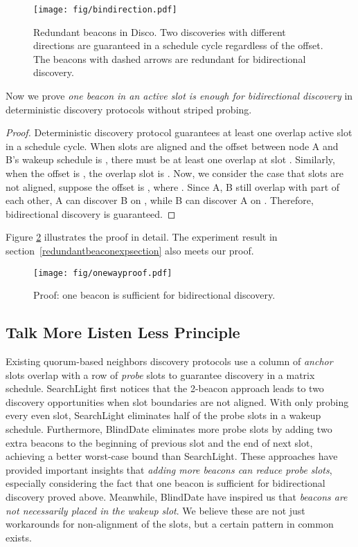 \documentclass[conference]{IEEEtran}
\begin{document}
\begin{figure}[t]
    \centering
    \texttt{[image: fig/bindirection.pdf]}
    \caption{Redundant beacons in Disco. Two discoveries with different directions are guaranteed in a schedule cycle regardless of the offset.
    The beacons with dashed arrows are redundant for bidirectional discovery.}\label{redundantbeacon}
\end{figure}

Now we prove \emph{one beacon in an active slot is enough for bidirectional discovery} in deterministic discovery protocols without striped probing.
\begin{proof}
Deterministic discovery protocol guarantees at least one overlap active slot in a schedule cycle.
When slots are aligned and the offset between node A and B's wakeup schedule is , there must be at least one overlap at slot .
Similarly, when the offset is , the overlap slot is .
Now, we consider the case that slots are not aligned, suppose the offset is , where .
Since A, B still overlap with part of each other, A can discover B on , while B can discover A on . Therefore, bidirectional discovery is guaranteed.
\end{proof}
Figure \ref{redundantbeaconproof} illustrates the proof in detail. The experiment result in section~\ref{redundantbeaconexpsection} also meets our proof.

\begin{figure}[t]
    \centering
    \texttt{[image: fig/onewayproof.pdf]}
    \caption{Proof: one beacon is sufficient for bidirectional discovery.}\label{redundantbeaconproof}
\end{figure}

\subsection{Talk More Listen Less Principle}
Existing quorum-based neighbors discovery protocols use a column of \emph{anchor} slots overlap with a row of \emph{probe} slots to guarantee discovery in a matrix schedule.
SearchLight first notices that the 2-beacon approach leads to two discovery opportunities when slot boundaries are not aligned.
With only probing every even slot, SearchLight eliminates half of the probe slots in a wakeup schedule.
Furthermore, BlindDate eliminates more probe slots by adding two extra beacons to the beginning of previous slot and the end of next slot, 
achieving a better worst-case bound than SearchLight.
These approaches have provided important insights that \emph{adding more beacons can reduce probe slots},
especially considering the fact that one beacon is sufficient for bidirectional discovery proved above.
Meanwhile, BlindDate have inspired us that \emph{beacons are not necessarily placed in the wakeup slot}.
We believe these are not just workarounds for non-alignment of the slots, but a certain pattern in common exists.
\end{document}
